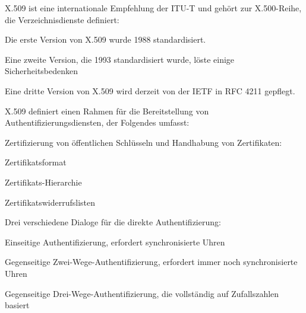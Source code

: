 \documentclass[a4paper]{article}
\begin{document}
\begin{multicols}{3}
      \begin{itemize*}
            \item X.509 ist eine internationale Empfehlung der ITU-T und gehört zur
            X.500-Reihe, die Verzeichnisdienste definiert:
            \begin{itemize*}
                  \item Die erste Version von X.509 wurde 1988 standardisiert.
                  \item Eine zweite Version, die 1993 standardisiert wurde, löste einige Sicherheitsbedenken
                  \item Eine dritte Version von X.509 wird derzeit von der IETF in RFC 4211 gepflegt.
            \end{itemize*}
            \item X.509 definiert einen Rahmen für die Bereitstellung von
            Authentifizierungsdiensten, der Folgendes umfasst:
            \begin{itemize*}
                  \item Zertifizierung von öffentlichen Schlüsseln und Handhabung von Zertifikaten:
                  \begin{itemize*}
                        \item Zertifikatsformat
                        \item Zertifikats-Hierarchie
                        \item Zertifikatswiderrufslisten
                  \end{itemize*}
                  \item Drei verschiedene Dialoge für die direkte Authentifizierung:
                  \begin{itemize*}
                        \item Einseitige Authentifizierung, erfordert synchronisierte Uhren
                        \item Gegenseitige Zwei-Wege-Authentifizierung, erfordert immer noch synchronisierte Uhren
                        \item Gegenseitige Drei-Wege-Authentifizierung, die vollständig auf Zufallszahlen basiert
                  \end{itemize*}
            \end{itemize*}
      \end{itemize*}



\end{multicols}
\end{document}
